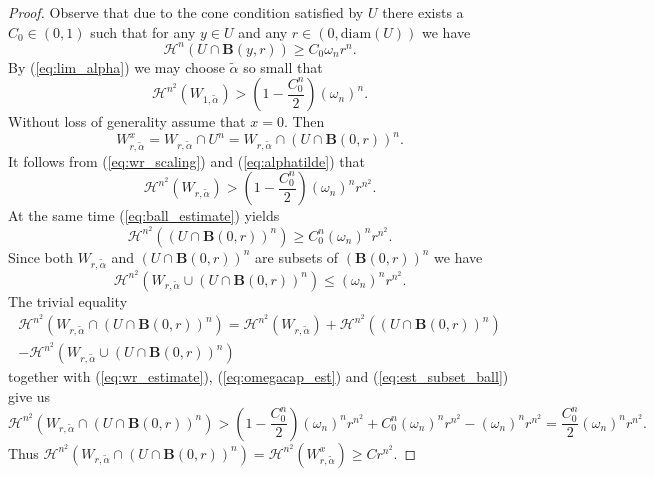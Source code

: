 \documentclass[11pt]{amsart}
\renewcommand{\H}{\mathscr{H}}
\newcommand{\diam}{\mathrm{diam}}
\theoremstyle{definition}
\begin{document}
\begin{proof}
		Observe that due to the cone condition satisfied by $ U$ there exists a $C_0\in(0,1)$ such that for any $y\in U$ and any $r\in (0,\diam( U))$ we have
		\begin{equation}\label{eq:ball_estimate}
		\H^n( U\cap \textbf{B}(y,r))\geq C_{0}\omega_nr^n.
		\end{equation} 
		By (\ref{eq:lim_alpha}) we may choose $\tilde{\alpha}$ so small that
		\begin{equation}\label{eq:alphatilde}
		\H^{n^2}(W_{1,\tilde{\alpha}})>\left(1-\frac{C_{0}^n}{2}\right)(\omega_n)^n.
		\end{equation} 
		Without loss of generality assume that $x=0$. Then 
		\begin{equation*}
		W^x_{r,\tilde{\alpha}} = W_{r,\tilde{\alpha}}\cap U^n=W_{r,\tilde{\alpha}}\cap( U\cap\textbf{B}(0,r))^n.
		\end{equation*} It follows from (\ref{eq:wr_scaling}) and (\ref{eq:alphatilde}) that 
		\begin{equation}\label{eq:wr_estimate}
		\H^{n^2}(W_{r,\tilde{\alpha}})>\left(1-\frac{C_{0}^n}{2}\right)(\omega_n)^nr^{n^2}.	
		\end{equation}
		At the same time (\ref{eq:ball_estimate}) yields
		\begin{equation}\label{eq:omegacap_est}
		\H^{n^2}(( U\cap \textbf{B}(0,r))^n)\geq C_{0}^n(\omega_n)^nr^{n^2}.
		\end{equation}
		Since both $W_{r,\tilde{\alpha}}$ and $( U\cap \textbf{B}(0,r))^n$ are subsets of $(\textbf{B}(0,r))^n$ we have
		\begin{equation}\label{eq:est_subset_ball}
		\H^{n^2}(W_{r,\tilde{\alpha}}\cup( U\cap\textbf{B}(0,r))^n)\leq (\omega_n)^nr^{n^2}.
		\end{equation}
		The trivial equality
		\begin{multline*}
		\H^{n^2}(W_{r,\tilde{\alpha}}\cap( U\cap\textbf{B}(0,r))^n) = \H^{n^2}(W_{r,\tilde{\alpha}})+ \H^{n^2}(( U\cap \textbf{B}(0,r))^n) \\
		-\H^{n^2}(W_{r,\tilde{\alpha}}\cup( U\cap\textbf{B}(0,r))^n)
		\end{multline*}
		together with (\ref{eq:wr_estimate}), (\ref{eq:omegacap_est}) and (\ref{eq:est_subset_ball}) give us
		\begin{equation*}
		\H^{n^2}(W_{r,\tilde{\alpha}}\cap( U\cap\textbf{B}(0,r))^n) > \left(1-\frac{C_{0}^n}{2}\right)(\omega_n)^nr^{n^2} +  C_{0}^n(\omega_n)^nr^{n^2} - (\omega_n)^nr^{n^2} = \frac{C_{0}^n}{2}(\omega_n)^nr^{n^2}.
		\end{equation*}
		Thus $\H^{n^2}(W_{r,\tilde{\alpha}}\cap( U\cap\textbf{B}(0,r))^n)=\H^{n^2}(W^x_{r,\tilde{\alpha}}) \geq Cr^{n^2}$.
	\end{proof}
	
\end{document}
